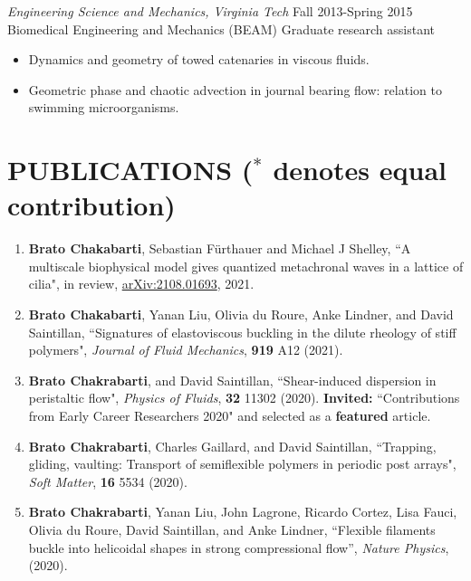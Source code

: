 \documentclass[10pt]{res} %
\begin{document}
\begin{resume}
{\sl Engineering Science and Mechanics, Virginia Tech} \hfill Fall 2013-Spring 2015\\[2pt]
Biomedical Engineering and Mechanics (BEAM) \hfill Graduate research assistant
\vspace*{2mm}
\begin{itemize} \itemsep -2pt %
\item Dynamics and geometry of towed catenaries in viscous fluids. 
\item Geometric phase and chaotic advection in journal bearing flow: relation to swimming microorganisms.
\end{itemize} 
 




\section{{PUBLICATIONS} {($^*$ denotes equal contribution)} }
\vspace*{6mm}
\begin{enumerate}
		\item \textbf{Brato Chakabarti}, Sebastian F\"{u}rthauer and Michael J Shelley, ``A multiscale biophysical model gives quantized metachronal waves in a lattice of cilia",  in review, \url{arXiv:2108.01693}, 2021.
		
	\item \textbf{Brato Chakabarti}, Yanan Liu, Olivia du Roure, Anke Lindner, and David Saintillan, ``Signatures of elastoviscous buckling in the dilute rheology of stiff polymers",  \textit{Journal of Fluid Mechanics},  \textbf{919} A12 (2021).
	
	\item \textbf{Brato Chakrabarti}, and David Saintillan, ``Shear-induced dispersion in peristaltic flow", \textit{Physics of Fluids}, \textbf{32} 11302 (2020).  \textbf{Invited:} ``Contributions from Early Career Researchers 2020" and selected as a \textbf{featured} article.
		
	\item \textbf{Brato Chakrabarti}, Charles Gaillard, and David Saintillan, ``Trapping, gliding, vaulting: Transport of semiflexible polymers in periodic post arrays", \textit{Soft Matter}, \textbf{16} 5534 (2020).
		
	
	\item \textbf{Brato Chakrabarti}, Yanan Liu, John Lagrone, Ricardo Cortez, Lisa Fauci, Olivia du Roure, David Saintillan, and Anke Lindner, ``Flexible filaments buckle into helicoidal shapes in strong compressional flow'',  \textit{Nature Physics}, (2020).
	

\end{enumerate}
\end{resume}
\end{document}
